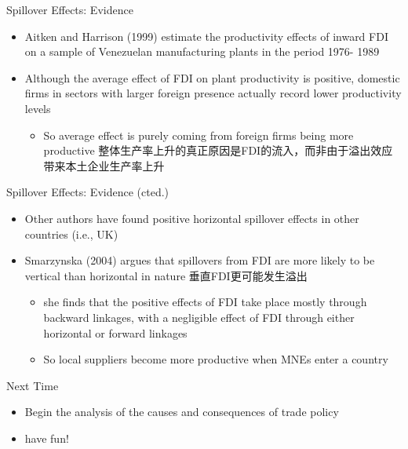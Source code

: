 \documentclass[10pt,hyperref={CJKbookmarks=true},xcolor=dvipsnames,aspectratio=169]{beamer}
\begin{document}
\begin{frame}{Spillover Effects: Evidence }

\begin{itemize}
\item Aitken and Harrison (1999) estimate the productivity effects of inward
FDI on a sample of Venezuelan manufacturing plants in the period 1976-
1989 
\item Although the average effect of FDI on plant productivity is positive,
domestic firms in sectors with larger foreign presence actually record
lower productivity levels 

\begin{itemize}
\item So average effect is purely coming from foreign firms being more productive
整体生产率上升的真正原因是FDI的流入，而非由于溢出效应带来本土企业生产率上升
\end{itemize}
\end{itemize}
\end{frame}

\begin{frame}{Spillover Effects: Evidence (cted.) }

\begin{itemize}
\item Other authors have found positive horizontal spillover effects in
other countries (i.e., UK) 
\item Smarzynska (2004) argues that spillovers from FDI are more likely
to be vertical than horizontal in nature 垂直FDI更可能发生溢出

\begin{itemize}
\item she finds that the positive effects of FDI take place mostly through
backward linkages, with a negligible effect of FDI through either
horizontal or forward linkages 
\item So local suppliers become more productive when MNEs enter a country 
\end{itemize}
\end{itemize}
\end{frame}

\begin{frame}{Next Time}

\begin{itemize}
\item Begin the analysis of the causes and consequences of trade policy 
\item have fun!
\end{itemize}
\end{frame}
\end{document}
